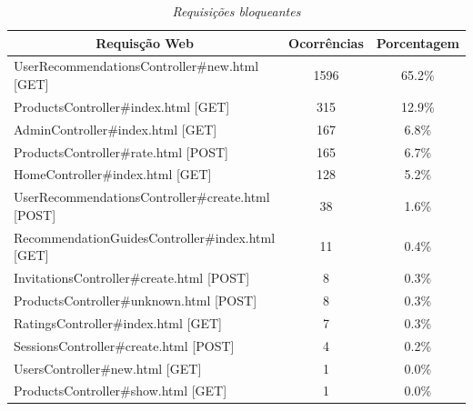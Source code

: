 \begin{table}[htbp]\centering
\begin{tabular}{l c c }\hline\hline
\multicolumn{1}{c}{\textbf{Requisção Web}}
& \textbf{Ocorrências}
& \textbf{Porcentagem}
 \\ \hline
UserRecommendationsController\#new.html [GET]     & 1596 & 65.2\% \\ 
ProductsController\#index.html [GET]              &  315 & 12.9\% \\ 
AdminController\#index.html [GET]                 &  167 &  6.8\% \\
ProductsController\#rate.html [POST]              &  165 &  6.7\% \\
HomeController\#index.html [GET]                  &  128 &  5.2\% \\ 
UserRecommendationsController\#create.html [POST] &   38 &  1.6\% \\
RecommendationGuidesController\#index.html [GET]  &   11 &  0.4\% \\  
InvitationsController\#create.html [POST]         &    8 &  0.3\% \\  
ProductsController\#unknown.html [POST]           &    8 &  0.3\% \\  
RatingsController\#index.html [GET]               &    7 &  0.3\% \\  
SessionsController\#create.html [POST]            &    4 &  0.2\% \\  
UsersController\#new.html [GET]                   &    1 &  0.0\% \\  
ProductsController\#show.html [GET]               &    1 &  0.0\% \\
\end{tabular}
\hline
\caption{\it Requisições bloqueantes \label{table:process_blockers}}
\end{table}



